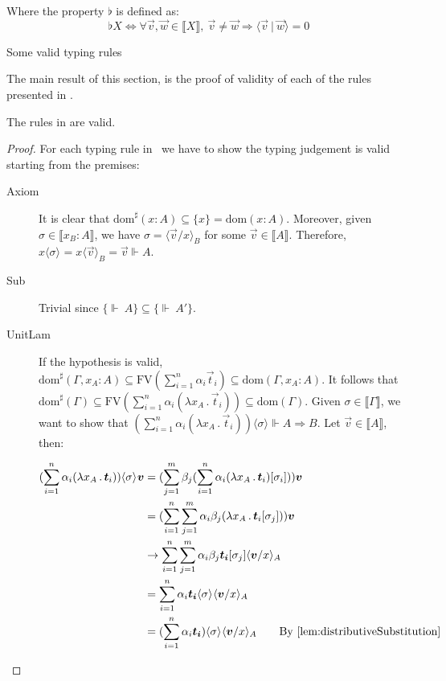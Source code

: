 \documentclass[runningheads,orivec]{llncs}
\newcommand\ansubst[2]{\ensuremath{\langle #1 \rangle_{#2}}}
\newcommand\dom[1]{\mathrm{dom}(#1)}
\newcommand\sdom[1]{\mathrm{dom}^{\sharp}(#1)}
\newcommand\FV[1]{\mathrm{FV}(#1)}
\def\scal#1#2{\langle{#1}~|~{#2}\rangle}
\def\Lam#1#2#3{\lambda#1_{#2}\,{.}\,#3} %
\def\Arr{\Rightarrow}
\def\sem#1{\llbracket#1\rrbracket}
\def\semr#1{\{{\real}~#1\}}
\def\real{\Vdash}
\begin{document}
\begin{table*}
    \parbox{\linewidth}{Where the property $\flat$ is defined as: 
    \[\flat X \iff \forall \vec v, \vec w\in\sem{X}, ~ \vec{v}\neq \vec w \Rightarrow \scal{\vec v}{\vec w} = 0
    \]
    }
    \caption{Some valid typing rules}
    \label{tab:TypingRules}
\end{table*}

The main result of this section, is the proof of validity of each of the rules presented in .

\begin{theorem}
    The rules in  are valid.
\end{theorem}

\begin{proof}
    For each typing rule in ~we have to show the typing judgement is valid starting from the premises:
    \begin{description}
    \item[Axiom] It is clear that $\sdom{x:A}\subseteq\{x\}=\dom{x:A}$. Moreover, given $\sigma\in\sem{x_B:A}$, we have $\sigma=\ansubst{\vec v/x}{B}$ for some $\vec{v}\in\sem{A}$. Therefore, $x\ansubst{\sigma}{}=x\ansubst{\vec v}{B}=\vec{v}\real A$.
    
    \item[Sub] Trivial since $\semr{A}\subseteq\semr{A'}$. 

    \item[UnitLam] If the hypothesis is valid, $\sdom{\Gamma,x_A:A}\subseteq \FV{\sum_{i=1}^{n}\alpha_i \vec t_i}\subseteq \dom{\Gamma,x_A:A}$. It follows that $\sdom{\Gamma}\subseteq \FV{\sum_{i=1}^{n}\alpha_i (\Lam{x}{A}{\vec t_i})}\subseteq \dom{\Gamma}$. Given $\sigma\in\sem{\Gamma}$, we want to show that $(\sum_{i=1}^{n}\alpha_i (\Lam{x}{A}{\vec t_i}))\ansubst{\sigma}{}\real A\Arr B$. Let $\vec v\in\sem{A}$, then:
    
    \begin{align*}
        (\sum_{i=1}^{n} \alpha_i(\Lam{x}{A}{\vec t_i}))\ansubst{\sigma}{} \vec v&= (\sum_{j=1}^{m} \beta_j (\sum_{i=1}^{n} \alpha_i (\Lam{x}{A}{\vec t_i}) [\sigma_i])) \vec{v} \\
        &= (\sum_{i=1}^{n}\sum_{j=1}^{m}\alpha_i\beta_j (\Lam{x}{A}{\vec t_i[\sigma_j]}))\vec v\\
        &\to \sum_{i=1}^{n}\sum_{j=1}^{m}\alpha_i\beta_j \vec{t_i}[\sigma_j]\ansubst{\vec v/x}{A}\\
        &=\sum_{i=1}^{n}\alpha_i \vec{t_i}\ansubst{\sigma}{}\ansubst{\vec v/x}{A}\\
        &=(\sum_{i=1}^{n}\alpha_i \vec{t_i})\ansubst{\sigma}{}\ansubst{\vec v/x}{A}\qquad{\text{By \Cref{lem:distributiveSubstitution}}}
    \end{align*}
    

\end{description}
\end{proof}
\end{document}
